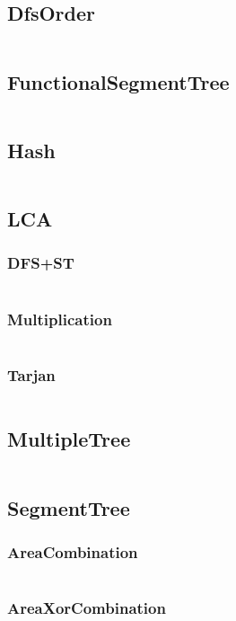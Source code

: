 \documentclass[a4paper,11pt]{article}
\begin{document}
\subsection{DfsOrder}
\inputminted[breaklines]{c++}{03++DataStructure/+DfsOrder.cpp}
\subsection{FunctionalSegmentTree}
\inputminted[breaklines]{c++}{03++DataStructure/+FunctionalSegmentTree.cpp}
\subsection{Hash}
\inputminted[breaklines]{c++}{03++DataStructure/+Hash.cpp}
\subsection{LCA}
\subsubsection{DFS+ST}
\inputminted[breaklines]{c++}{03++DataStructure/+LCA/+DFS+ST.cpp}
\subsubsection{Multiplication}
\inputminted[breaklines]{c++}{03++DataStructure/+LCA/+Multiplication.cpp}
\subsubsection{Tarjan}
\inputminted[breaklines]{c++}{03++DataStructure/+LCA/+Tarjan.cpp}

\subsection{MultipleTree}
\inputminted[breaklines]{c++}{03++DataStructure/+MultipleTree.cpp}
\subsection{SegmentTree}
\subsubsection{AreaCombination}
\inputminted[breaklines]{c++}{03++DataStructure/+SegmentTree/+AreaCombination.cpp}
\subsubsection{AreaXorCombination}
\inputminted[breaklines]{c++}{03++DataStructure/+SegmentTree/+AreaXorCombination.cpp}
\end{document}
